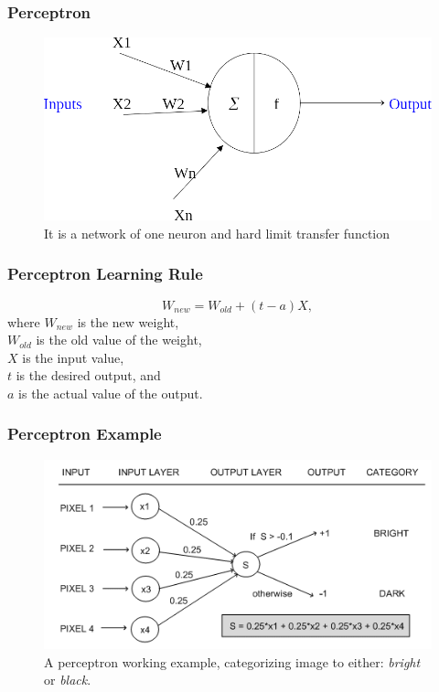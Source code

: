 \documentclass{beamer}
\begin{document}
\begin{frame}
    \frametitle{Perceptron}
\begin{figure}[]
    \centering
    \includegraphics[width=\textwidth,height=\textheight,keepaspectratio]{assets/images/ANN.png}
    \caption{ It is a network of one neuron and hard limit transfer function}
\end{figure}

\end{frame}


\begin{frame}
    \frametitle{Perceptron Learning Rule}

    \begin{equation}
        W_{new}=W_{old}+(t-a)X,
    \end{equation}
where $W_{new}$ is the new weight, \\ $W_{old}$ is the old value of the weight,\\ $X$ is the input value, \\ $t$ is the desired output, and \\ $a$ is the actual value of the output.

\end{frame}


\begin{frame}
    \frametitle{Perceptron Example}
    \begin{figure}[]
        \centering
        \includegraphics[width=\textwidth,height=\textheight,keepaspectratio]{assets/images/example.png}
        \caption{ A perceptron working example, categorizing image to either: \textit{bright} or \textit{black}.}
    \end{figure}
    
\end{frame}
\end{document}
